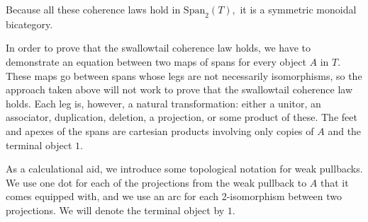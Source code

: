 \documentclass{article}
\newcommand{\x}{\times}
\newcommand{\Span}{\mbox{Span}}
\begin{document}
Because all these coherence laws hold in $\Span_2(T),$ it is a symmetric monoidal bicategory.

\newcommand{\pb}[1]{\begin{tikzpicture}[dot/.style={fill,inner sep=1pt,circle}, scale=.2]
  \xdef\lastx{0}
  \foreach \x / \y [count=\n] in {#1} {
    \draw[draw=\ifnum\y>0 black\else white\fi] (\lastx, 0) to[out=90,in=90,looseness=1.7] (\x, 0);
    \xdef\lastx{\x}
  }
  \foreach \x in {0,...,\n} \draw[black] (\x,0) node[dot]{};
\end{tikzpicture}}

In order to prove that the swallowtail coherence law holds, we have to demonstrate an equation between two maps of spans for every object $A$ in $T$.  These maps go between spans whose legs are not necessarily isomorphisms, so the approach taken above will not work to prove that the swallowtail coherence law holds.  Each leg is, however, a natural transformation: either a unitor, an associator, duplication, deletion, a projection, or some product of these.  The feet and apexes of the spans are cartesian products involving only copies of $A$ and the terminal object $1$.

As a calculational aid, we introduce some topological notation for weak pullbacks.  We use one dot for each of the projections from the weak pullback to $A$ that it comes equipped with, and we use an arc for each 2-isomorphism between two projections.  We will denote the terminal object by $1$.
\end{document}
